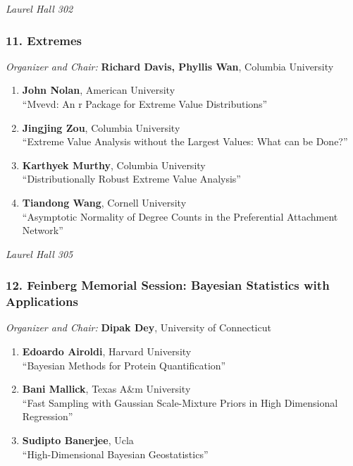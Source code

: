 \emph{Laurel Hall 302} \\[.5em]

\subsubsection*{11. Extremes}

\emph{Organizer and Chair:} \textbf{Richard Davis, Phyllis Wan}, Columbia University

\begin{enumerate}
\item \textbf{John Nolan}, American University \\
``Mvevd: An r Package for Extreme Value Distributions''
\item \textbf{Jingjing Zou}, Columbia University \\
``Extreme Value Analysis without the Largest Values: What can be Done?''
\item \textbf{Karthyek Murthy}, Columbia University \\
``Distributionally Robust Extreme Value Analysis''
\item \textbf{Tiandong Wang}, Cornell University \\
``Asymptotic Normality of Degree Counts in the Preferential Attachment Network''
\end{enumerate}

\emph{Laurel Hall 305} \\[.5em]

\subsubsection*{12. Feinberg Memorial Session: Bayesian Statistics with Applications}

\emph{Organizer and Chair:} \textbf{Dipak Dey}, University of Connecticut

\begin{enumerate}
\item \textbf{Edoardo Airoldi}, Harvard University \\
``Bayesian Methods for Protein Quantification''
\item \textbf{Bani Mallick}, Texas A\&m University \\
``Fast Sampling with Gaussian Scale-Mixture Priors in High Dimensional Regression''
\item \textbf{Sudipto Banerjee}, Ucla \\
``High-Dimensional Bayesian Geostatistics''
\end{enumerate}

